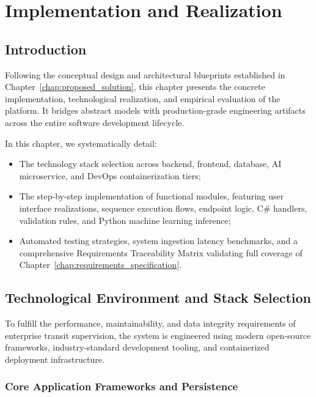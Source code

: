 ﻿\chapter{Implementation and Realization}
\label{chap:implementation}

\section{Introduction}
\label{sec:impl_intro}

Following the conceptual design and architectural blueprints established in Chapter~\ref{chap:proposed_solution}, this chapter presents the concrete implementation, technological realization, and empirical evaluation of the  platform. It bridges abstract models with production-grade engineering artifacts across the entire software development lifecycle.

In this chapter, we systematically detail:
\begin{itemize}
  \item The technology stack selection across backend, frontend, database, AI microservice, and DevOps containerization tiers;
  \item The step-by-step implementation of functional modules, featuring user interface realizations, sequence execution flows, endpoint logic, C\# handlers, validation rules, and Python machine learning inference;
  \item Automated testing strategies, system ingestion latency benchmarks, and a comprehensive Requirements Traceability Matrix validating full coverage of Chapter~\ref{chap:requirements_specification}.
\end{itemize}

\section{Technological Environment and Stack Selection}
\label{sec:impl_tech_stack}

To fulfill the performance, maintainability, and data integrity requirements of enterprise transit supervision, the system is engineered using modern open-source frameworks, industry-standard development tooling, and containerized deployment infrastructure.

\subsection{Core Application Frameworks and Persistence}
\label{sec:impl_core_stack}

